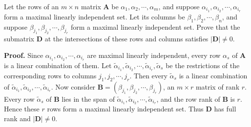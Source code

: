 \documentclass[12pt, a4paper, oneside]{book}
\begin{document}
\begin{theorem}
    Let the rows of an $m \times n$ matrix $\mathbf{A}$ be ${\alpha}_1, {\alpha}_2, \cdots, {\alpha}_m$, and suppose ${\alpha}_{i_1}, {\alpha}_{i_2}, \cdots, {\alpha}_{i_r}$ form a maximal linearly independent set. Let its columns be ${\beta}_1, {\beta}_2, \cdots, {\beta}_n$, and suppose ${\beta}_{j_1}, {\beta}_{j_2}, \cdots, {\beta}_{j_r}$ form a maximal linearly independent set. Prove that the submatrix $\mathbf{D}$ at the intersections of these rows and columns satisfies $|\mathbf{D}| \neq 0$.

    \textbf{Proof.}
    Since ${\alpha}_{i_1}, {\alpha}_{i_2}, \cdots, {\alpha}_{i_r}$ are maximal linearly independent, every row ${\alpha}_s$ of $\mathbf{A}$ is a linear combination of them. Let $\widetilde{{\alpha}}_{i_1}, \widetilde{{\alpha}}_{i_2}, \cdots, \widetilde{{\alpha}}_{i_r}, \widetilde{{\alpha}}_s$ be the restrictions of the corresponding rows to columns $j_1, j_2, \cdots, j_r$. Then every $\widetilde{{\alpha}}_s$ is a linear combination of $\widetilde{{\alpha}}_{i_1}, \widetilde{{\alpha}}_{i_2}, \cdots, \widetilde{{\alpha}}_{i_r}$. Now consider $\mathbf{B}=\left({\beta}_{j_1}, {\beta}_{j_2}, \cdots, {\beta}_{j_r}\right)$, an $m \times r$ matrix of rank $r$.
    Every row $\widetilde{{\alpha}}_s$ of $\mathbf{B}$ lies in the span of $\widetilde{{\alpha}}_{i_1}, \widetilde{{\alpha}}_{i_2}, \cdots, \widetilde{{\alpha}}_{i_r}$, and the row rank of $\mathbf{B}$ is $r$. Hence these $r$ rows form a maximal linearly independent set. Thus $\mathbf{D}$ has full rank and $|\mathbf{D}| \neq 0$.
\end{theorem}

\section{}
\end{document}

